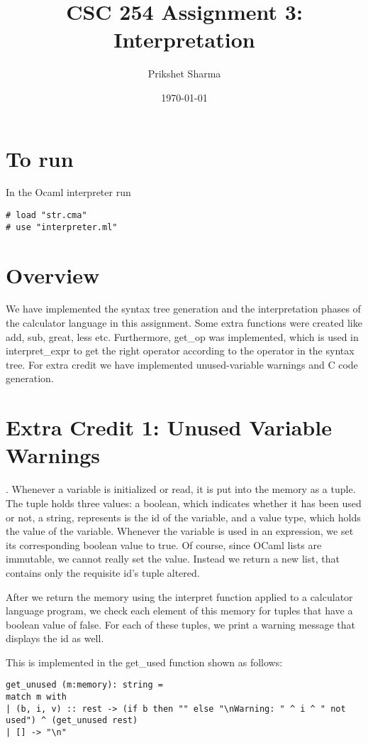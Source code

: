 \documentclass[12pt, letterpaper, twoside]{article}
\title{CSC 254 Assignment 3: Interpretation}
\author{Prikshet Sharma}
\date{\today}
\begin{document}
\maketitle

\section {To run}
In the Ocaml interpreter run
\begin{lstlisting} 
# load "str.cma"
# use "interpreter.ml"
\end{lstlisting}
\section{Overview}
We have implemented the syntax tree generation and the interpretation phases of the calculator language in this assignment. Some extra functions were created like add, sub, great, less etc. Furthermore, get\_op was implemented, which is used in interpret\_expr to get the right operator according to the operator in the syntax tree. For extra credit we have implemented unused-variable warnings and C code generation. \par   

\section {Extra Credit 1: Unused Variable Warnings}
. Whenever a variable is initialized or read, it is put into the memory as a tuple. The tuple holds three values: a boolean, which indicates whether it has been used or not, a string, represents is the id of the variable, and a value type, which holds the value of the variable. Whenever the variable is used in an expression, we set its corresponding boolean value to true. Of course, since OCaml lists are immutable, we cannot really set the value. Instead we return a new list, that contains only the requisite id's tuple altered. \par
After we return the memory using the interpret function applied to a calculator language program, we check each element of this memory for tuples that have a boolean value of false. For each of these tuples, we print a warning message that displays the id as well. \par 
This is implemented in the get\_used function shown as follows:
\begin{lstlisting}
get_unused (m:memory): string = 
match m with                                                                                                                                                                                                                                                                        
| (b, i, v) :: rest -> (if b then "" else "\nWarning: " ^ i ^ " not used") ^ (get_unused rest)                                                                                                                                                                                      
| [] -> "\n"      
\end{lstlisting}
\end{document}
